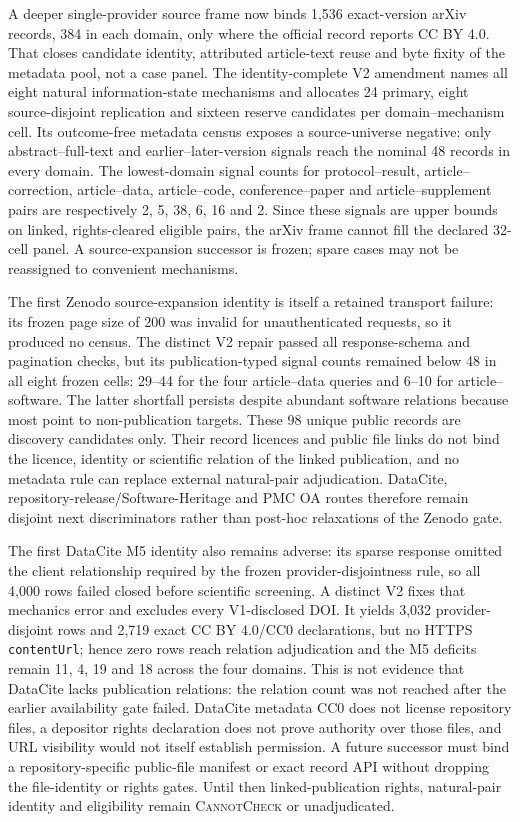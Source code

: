 A deeper single-provider source frame now binds 1,536 exact-version arXiv
records, 384 in each domain, only where the official record reports CC BY 4.0.
That closes candidate identity, attributed article-text reuse and byte fixity of
the metadata pool, not a case panel.  The identity-complete V2 amendment names
all eight natural information-state mechanisms and allocates 24 primary, eight
source-disjoint replication and sixteen reserve candidates per domain--mechanism
cell.  Its outcome-free metadata census exposes a source-universe negative:
only abstract--full-text and earlier--later-version signals reach the nominal 48
records in every domain.  The lowest-domain signal counts for protocol--result,
article--correction, article--data, article--code, conference--paper and
article--supplement pairs are respectively 2, 5, 38, 6, 16 and 2.  Since these
signals are upper bounds on linked, rights-cleared eligible pairs, the arXiv
frame cannot fill the declared 32-cell panel.  A source-expansion successor is
frozen; spare cases may not be reassigned to convenient mechanisms.

The first Zenodo source-expansion identity is itself a retained transport
failure: its frozen page size of 200 was invalid for unauthenticated requests,
so it produced no census.  The distinct V2 repair passed all response-schema
and pagination checks, but its publication-typed signal counts remained below
48 in all eight frozen cells: 29--44 for the four article--data queries and
6--10 for article--software.  The latter shortfall persists despite abundant
software relations because most point to non-publication targets.  These 98
unique public records are discovery candidates only.  Their record licences
and public file links do not bind the licence, identity or scientific relation
of the linked publication, and no metadata rule can replace external
natural-pair adjudication.  DataCite, repository-release/Software-Heritage and
PMC OA routes therefore remain disjoint next discriminators rather than
post-hoc relaxations of the Zenodo gate.

The first DataCite M5 identity also remains adverse: its sparse response omitted
the client relationship required by the frozen provider-disjointness rule, so
all 4,000 rows failed closed before scientific screening. A distinct V2 fixes
that mechanics error and excludes every V1-disclosed DOI. It yields 3,032
provider-disjoint rows and 2,719 exact CC BY 4.0/CC0 declarations, but no HTTPS
\texttt{contentUrl}; hence zero rows reach relation adjudication and the M5
deficits remain 11, 4, 19 and 18 across the four domains. This is not evidence
that DataCite lacks publication relations: the relation count was not reached
after the earlier availability gate failed. DataCite metadata CC0 does not
license repository files, a depositor rights declaration does not prove
authority over those files, and URL visibility would not itself establish
permission. A future successor must bind a repository-specific public-file
manifest or exact record API without dropping the file-identity or rights gates.
Until then linked-publication rights, natural-pair identity and eligibility
remain \textsc{CannotCheck} or unadjudicated.

